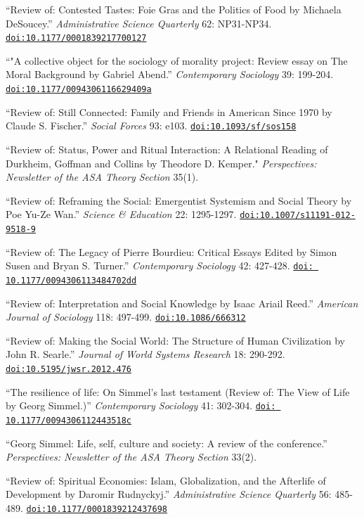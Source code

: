 
\begin{sloppypar}
\ind ``Review of: Contested Tastes: Foie Gras and the Politics of Food by Michaela DeSoucey.'' {\em Administrative Science Quarterly} 62: NP31-NP34. \href{https://doi.org/10.1177/0001839217700127}{\nolinkurl{doi:10.1177/0001839217700127}}
\end{sloppypar}

\ind ``"A collective object for the sociology of morality project: Review essay on The Moral Background by Gabriel Abend.'' {\em Contemporary Sociology} 39: 199-204.  \href{https://doi.org/10.1177/0094306116629409a}{\nolinkurl{doi:10.1177/0094306116629409a}}

\ind ``Review of: Still Connected: Family and Friends in American Since 1970 by Claude S. Fischer.'' {\em Social Forces} 93: e103. \href{https://doi.org/10.1093/sf/sos158}{\nolinkurl{doi:10.1093/sf/sos158}}

\ind ``Review of: Status, Power and Ritual Interaction: A Relational Reading of Durkheim, Goffman and Collins by Theodore D. Kemper." {\em Perspectives: Newsletter of the ASA Theory Section} 35(1).

\ind ``Review of: Reframing the Social: Emergentist Systemism and Social Theory by Poe Yu-Ze Wan.'' {\em Science \& Education} 22: 1295-1297. \href{https://doi.org/10.1007/s11191-012-9518-9}{\nolinkurl{doi:10.1007/s11191-012-9518-9}}

\ind ``Review of: The Legacy of Pierre Bourdieu: Critical Essays Edited by Simon Susen and Bryan S. Turner.'' {\em Contemporary Sociology} 42: 427-428. \href{https://doi.org/10.1177/0094306113484702dd}{\nolinkurl{doi: 10.1177/0094306113484702dd}}

\ind ``Review of: Interpretation and Social Knowledge by Isaac Ariail Reed.'' {\em American Journal of Sociology} 118: 497-499. \href{https://doi.org/10.1086/666312}{\nolinkurl{doi:10.1086/666312}}

\ind ``Review of: Making the Social World: The Structure of Human Civilization by John R. Searle.'' {\em Journal of World Systems Research} 18: 290-292. \href{https://doi.org/10.5195/jwsr.2012.476}{\nolinkurl{doi:10.5195/jwsr.2012.476}}

\ind ``The resilience of life: On Simmel's last testament (Review of: The View of Life by Georg Simmel.)'' {\em Contemporary Sociology} 41: 302-304. \href{https://doi.org/10.1177/0094306112443518c}{\nolinkurl{doi: 10.1177/0094306112443518c}}

\ind  ``Georg Simmel: Life, self, culture and society: A review of the conference.''  {\em Perspectives: Newsletter of the ASA Theory Section} 33(2).

\ind ``Review of:  Spiritual Economies: Islam, Globalization, and the Afterlife of Development by Daromir Rudnyckyj.'' {\em Administrative Science Quarterly} 56: 485-489. \href{https://doi.org/10.1177/0001839212437698}{\nolinkurl{doi:10.1177/0001839212437698}}

